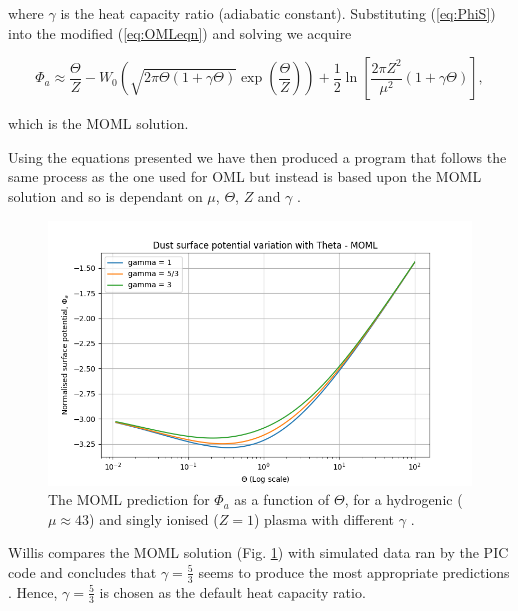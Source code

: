 \documentclass[journal]{Imperial_lab_report}
\begin{document}
\noindent where $\gamma$ is the heat capacity ratio (adiabatic constant). Substituting (\ref{eq:PhiS}) into the modified (\ref{eq:OMLeqn}) and solving we acquire

\begin{equation}\label{eq:MOMLsol}
\Phi_a \approx  \frac{\Theta}{Z} - W_{0}\left(\sqrt{2\pi \Theta (1 + \gamma \Theta)} \exp{\left (\frac{\Theta}{Z}\right)}\right) + \frac{1}{2}\ln{\left[\frac{2\pi Z^2}{\mu^2}(1 + \gamma \Theta)\right]},
\end{equation}

\noindent which is the MOML solution.

\medskip

Using the equations presented we have then produced a program that follows the same process as the one used for OML but instead is based upon the MOML solution and so is dependant on $\mu$, $\Theta$, $Z$ and $\gamma$ \cite{Coppins}. 

\begin{figure}[H]
\centering
\includegraphics[width=\linewidth]{Output/MOMLgamma.jpeg}
\caption{The MOML prediction for  $\Phi_a$ as a function of $\Theta$, for a hydrogenic ($\mu \approx 43$) and singly ionised ($Z = 1$) plasma with different $\gamma$ \cite{Thomas}.}
\label{MOMLgamma} 
\end{figure}

Willis compares the MOML solution (Fig. \ref{MOMLgamma}) with simulated data ran by the PIC code and concludes that $\gamma = \frac{5}{3}$ seems to produce the most appropriate predictions \cite{Willis}. Hence, $\gamma = \frac{5}{3}$ is chosen as the default heat capacity ratio.
\end{document}
